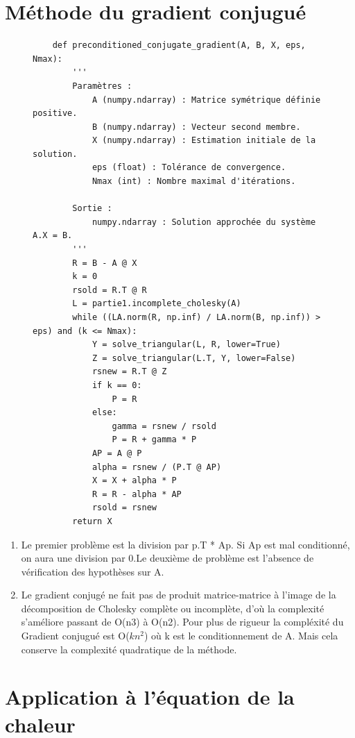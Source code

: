 \documentclass{article}
\begin{document}
\section*{Méthode du gradient conjugué}
\begin{figure}[h]
    \centering
    \begin{verbatim}
    def preconditioned_conjugate_gradient(A, B, X, eps, Nmax):
        '''
        Paramètres :
            A (numpy.ndarray) : Matrice symétrique définie positive.
            B (numpy.ndarray) : Vecteur second membre.
            X (numpy.ndarray) : Estimation initiale de la solution.
            eps (float) : Tolérance de convergence.
            Nmax (int) : Nombre maximal d'itérations.
        
        Sortie :
            numpy.ndarray : Solution approchée du système A.X = B.
        '''
        R = B - A @ X
        k = 0
        rsold = R.T @ R
        L = partie1.incomplete_cholesky(A)
        while ((LA.norm(R, np.inf) / LA.norm(B, np.inf)) > eps) and (k <= Nmax):
            Y = solve_triangular(L, R, lower=True)
            Z = solve_triangular(L.T, Y, lower=False)
            rsnew = R.T @ Z
            if k == 0:
                P = R
            else:
                gamma = rsnew / rsold
                P = R + gamma * P
            AP = A @ P
            alpha = rsnew / (P.T @ AP)
            X = X + alpha * P
            R = R - alpha * AP
            rsold = rsnew
        return X
    \end{verbatim}
    \label{fig:conjgrad}
\end{figure}

\begin{enumerate}
    \item Le premier problème est la division par p.T * Ap. Si Ap est mal conditionné, on aura une division par 0.Le deuxième de problème est l'absence de vérification des hypothèses sur A.
    \item Le gradient conjugé ne fait pas de produit matrice-matrice à l'image de la décomposition de Cholesky complète ou incomplète, d'où la complexité s'améliore passant de O(n3) à O(n2). Pour plus de rigueur la compléxité du Gradient conjugué est O($kn^2$) où k est le conditionnement de A. Mais cela conserve la complexité quadratique de la méthode.
\end{enumerate}

\newpage
\section*{Application à l'équation de la chaleur}
\end{document}
